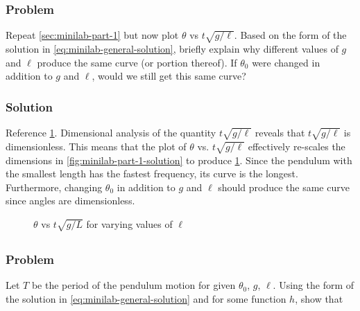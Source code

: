 \documentclass[12pt]{article}
\begin{document}
  \subsubsection*{Problem}
  Repeat \cref{sec:minilab-part-1} but now plot $\theta$ vs $t\sqrt{g/\ell}$.
  Based on the form of the solution in \cref{eq:minilab-general-solution},
  briefly explain why different values of $g$ and $\ell$ produce the same curve
  (or portion thereof). If $\theta_0$ were changed in addition to $g$ and
  $\ell$, would we still get this same curve?

  \subsubsection*{Solution}
  Reference \cref{fig:minilab-part-2-solution}. Dimensional analysis of the quantity
  $t\sqrt{g/\ell}$ reveals that $t\sqrt{g/\ell}$ is dimensionless. This means
  that the plot of $\theta$ vs. $t\sqrt{g/\ell}$ effectively re-scales the
  dimensions in \cref{fig:minilab-part-1-solution} to produce \cref{fig:minilab-part-2-solution}.
  Since the pendulum with the smallest length has the fastest frequency, its
  curve is the longest. Furthermore, changing $\theta_0$ in addition to $g$ and
  $\ell$ should produce the same curve since angles are dimensionless.

  \begin{figure}
    \centering
    \caption{$\theta$ vs $t\sqrt{g/L}$ for varying values of $\ell$}
\label{fig:minilab-part-2-solution}
  \end{figure}

\subsection{}
  \subsubsection*{Problem}
  Let $T$ be the period of the pendulum motion for given $\theta_0$, $g$,
  $\ell$. Using the form of the solution in \cref{eq:minilab-general-solution}
  and for some function $h$, show that
\end{document}
